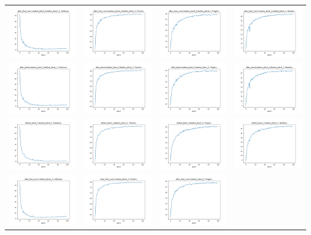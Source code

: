 \begin{longtable}{cccc}
\includegraphics[scale=0.2]{./images/mixup_position/after_final_conv1;before_block_0;before_block_3_ValidLoss.png} & \includegraphics[scale=0.2]{./images/mixup_position/after_final_conv1;before_block_0;before_block_3_CharAcc.png} & \includegraphics[scale=0.2]{./images/mixup_position/after_final_conv1;before_block_0;before_block_3_FragAcc.png} & \includegraphics[scale=0.2]{./images/mixup_position/after_final_conv1;before_block_0;before_block_3_WordAcc.png}\\
\includegraphics[scale=0.2]{./images/mixup_position/after_blocks;before_block_0;before_block_2_ValidLoss.png} & \includegraphics[scale=0.2]{./images/mixup_position/after_blocks;before_block_0;before_block_2_CharAcc.png} & \includegraphics[scale=0.2]{./images/mixup_position/after_blocks;before_block_0;before_block_2_FragAcc.png} & \includegraphics[scale=0.2]{./images/mixup_position/after_blocks;before_block_0;before_block_2_WordAcc.png}\\
\includegraphics[scale=0.2]{./images/mixup_position/before_block_1;before_block_3_ValidLoss.png} & \includegraphics[scale=0.2]{./images/mixup_position/before_block_1;before_block_3_CharAcc.png} & \includegraphics[scale=0.2]{./images/mixup_position/before_block_1;before_block_3_FragAcc.png} & \includegraphics[scale=0.2]{./images/mixup_position/before_block_1;before_block_3_WordAcc.png}\\
\includegraphics[scale=0.2]{./images/mixup_position/after_final_conv1;before_block_4_ValidLoss.png} & \includegraphics[scale=0.2]{./images/mixup_position/after_final_conv1;before_block_4_CharAcc.png} & \includegraphics[scale=0.2]{./images/mixup_position/after_final_conv1;before_block_4_FragAcc.png} & 
\end{longtable}

